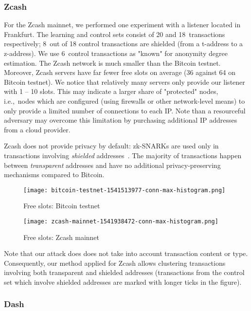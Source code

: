 \subsubsection{Zcash}

For the Zcash mainnet, we performed one experiment with a listener located in Frankfurt.
The learning and control sets consist of 20 and 18~transactions respectively; 8~out of 18 control transactions are shielded (from a t-address to a z-address).
We use 6~control transactions as "known" for anonymity degree estimation.
The Zcash network is much smaller than the Bitcoin testnet.
Moreover, Zcash servers have far fewer free slots on average (36 against 64 on Bitcoin testnet).
We notice that relatively many servers only provide our listener with 1 -- 10 slots.
This may indicate a larger share of "protected" nodes, i.e.,~nodes which are configured (using firewalls or other network-level means) to only provide a limited number of connections to each IP.
Note than a resourceful adversary may overcome this limitation by purchasing additional IP addresses from a cloud provider.

Zcash does not provide privacy by default: zk-SNARKs are used only in transactions involving \textit{shielded} addresses~\cite{Kappos2018}.
The majority of transactions happen between \textit{transparent} addresses and have no additional privacy-preserving mechanisms compared to Bitcoin.

\begin{figure*}
	\centering
	\begin{minipage}{0.5\textwidth}
		\centering
		\texttt{[image: bitcoin-testnet-1541513977-conn-max-histogram.png]}
		\caption{Free slots: Bitcoin testnet}
	\end{minipage}\hfill
	\begin{minipage}{0.5\textwidth}
		\centering
		\texttt{[image: zcash-mainnet-1541938472-conn-max-histogram.png]}
		\caption{Free slots: Zcash mainnet}
	\end{minipage}\hfill
	\label{fig:free-slots}
\end{figure*}

Note that our attack does does not take into account transaction content or type.
Consequently, our method applied for Zcash allows clustering transactions involving both transparent and shielded addresses (transactions from the control set which involve shielded addresses are marked with longer ticks in the figure).


\subsubsection{Dash}

